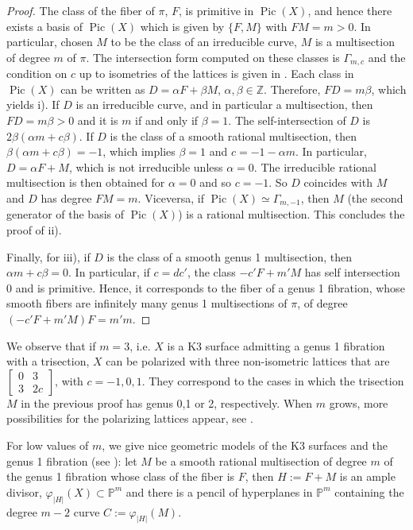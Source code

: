 \documentclass{amsart}
\theoremstyle{definition}
\numberwithin{equation}{section}
\newcommand{\Z}{\mathbb{Z}}
\DeclareMathOperator{\Pic}{Pic}
\begin{document}
\begin{proof} The class of the fiber of $\pi$, $F$, is primitive in $\Pic(X)$, and hence there exists a basis of $\Pic(X)$ which is given by $\{F,M\}$ with $FM=m>0$. In particular, chosen $M$ to be the class of an irreducible curve, $M$ is a multisection of degree $m$ of $\pi$. The intersection form computed on these classes is $\Gamma_{m,c}$ and the condition on $c$ up to isometries of the lattices is given in \cite[Proposition 3.7]{vanGeemen}. Each class in $\Pic(X)$ can be written as $D=\alpha F+\beta M$, $\alpha,\beta\in \Z$. Therefore, $FD=m\beta$, which yields i). If $D$ is an irreducible curve, and in particular a multisection, then $FD=m\beta>0$ and it is $m$ if and only if $\beta=1$. The self-intersection of $D$ is $2\beta(\alpha m+c\beta)$. If $D$ is the class of a smooth rational multisection, then $\beta(\alpha m+c\beta)=-1$, which implies $\beta=1$ and $c=-1-\alpha m$. In particular, $D=\alpha F+M$, which is not irreducible unless $\alpha=0$. The irreducible rational multisection is then obtained for $\alpha=0$ and so $c=-1$. So $D$ coincides with $M$ and $D$ has degree $FM=m$. Viceversa, if $\Pic(X)\simeq \Gamma_{m,-1}$, then $M$ (the second generator of the basis of $\Pic(X)$) is a rational multisection. This concludes the proof of ii).

Finally, for iii), if $D$ is the class of a smooth genus 1 multisection, then $\alpha m+c\beta=0$. In particular, if $c=dc'$, the class $-c'F+m'M$ has self intersection 0 and is primitive. Hence, it corresponds to the fiber of a genus 1 fibration, whose smooth fibers are infinitely many genus 1 multisections of $\pi$, of degree $(-c'F+m'M)F=m'm$.
\end{proof}

 We observe that if $m=3$, i.e. $X$ is a K3 surface admitting a genus 1 fibration with a trisection, $X$ can be polarized with three non-isometric lattices that are $\left[\begin{array}{cc}0&3\\3&2c\end{array}\right]$, with $c=-1,0,1$. They correspond to the cases in which the trisection $M$ in the previous proof has genus 0,1 or 2, respectively. When $m$ grows, more possibilities for the polarizing lattices appear, see \cite[Proposition 3.7]{vanGeemen}.

For low values of $m$, we give nice geometric models of the K3 surfaces and the genus 1 fibration (see \cite[Paragraph 5.2]{vanGeemen}): let $M$ be a smooth rational multisection of degree $m$ of the genus 1 fibration whose class of the fiber is $F$, then $H:=F+M$ is an ample divisor, $\varphi_{|H|}(X)\subset\mathbb{P}^m$ and there is a pencil of hyperplanes in $\mathbb{P}^m$ containing the degree $m-2$ curve $C:=\varphi_{|H|}(M)$. 
\end{document}
